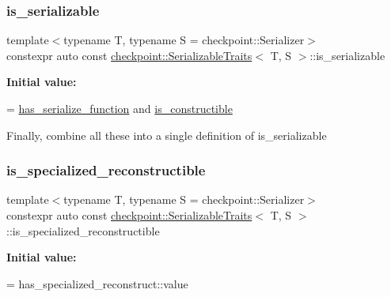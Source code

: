 \subsubsection{\texorpdfstring{is\+\_\+serializable}{is\_serializable}}
{\footnotesize\ttfamily template$<$typename T, typename S = checkpoint\+::\+Serializer$>$ \\
constexpr auto const \hyperlink{structcheckpoint_1_1_serializable_traits}{checkpoint\+::\+Serializable\+Traits}$<$ T, S $>$\+::is\+\_\+serializable\hspace{0.3cm}{\ttfamily [static]}}

{\bfseries Initial value\+:}
\begin{DoxyCode}
=
    \hyperlink{structcheckpoint_1_1_serializable_traits_a4d17a7627a8e033cccb5cf4e6b8fd0dc}{has\_serialize\_function} and \hyperlink{structcheckpoint_1_1_serializable_traits_a7720e2f57d1b3d2f87fd022b47d0b775}{is\_constructible}
\end{DoxyCode}
Finally, combine all these into a single definition of is\+\_\+serializable \mbox{\label{structcheckpoint_1_1_serializable_traits_a305317a4e8fb44498f195a39bf59ad2d}} 
\subsubsection{\texorpdfstring{is\+\_\+specialized\+\_\+reconstructible}{is\_specialized\_reconstructible}}
{\footnotesize\ttfamily template$<$typename T, typename S = checkpoint\+::\+Serializer$>$ \\
constexpr auto const \hyperlink{structcheckpoint_1_1_serializable_traits}{checkpoint\+::\+Serializable\+Traits}$<$ T, S $>$\+::is\+\_\+specialized\+\_\+reconstructible\hspace{0.3cm}{\ttfamily [static]}}

{\bfseries Initial value\+:}
\begin{DoxyCode}
=
    has\_specialized\_reconstruct::value
\end{DoxyCode}
\mbox{\label{structcheckpoint_1_1_serializable_traits_aa6618d9f36e37127006112c73755fceb}} 
